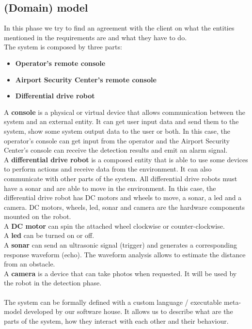 \documentclass{llncs}
\newcommand{\labelssec}[1]{\label{ssec:#1}}
\begin{document}
\subsection{(Domain) model}
\labelssec{Domain model}
In this phase we try to find an agreement with the client on what the entities mentioned in the requirements are and what they have to do.\\The system is composed by three parts:
\begin{itemize}
\item \textbf{Operator's remote console}
\item \textbf{Airport Security Center's remote console}
\item \textbf{Differential drive robot}
\end{itemize}
A \textbf{console} is a physical or virtual device that allows communication between the system and an external entity. It can get user input data and send them to the system, show some system output data to the user or both. In this case, the operator's console can get input from the operator and the Airport Security Center's console can receive the detection results and emit an alarm signal.
\\A \textbf{differential drive robot} is a composed entity that is able to use some devices to perform actions and receive data from the environment. It can also communicate with other parts of the system. All differential drive robots must have a sonar and are able to move in the environment. In this case, the differential drive robot has DC motors and wheels to move, a sonar, a led and a camera.
DC motors, wheels, led, sonar and camera are the hardware components mounted on the robot.
\\A \textbf{DC motor} can spin the attached wheel clockwise or counter-clockwise.
\\A \textbf{led} can be turned on or off.
\\A \textbf{sonar} can send an ultrasonic signal (trigger) and generates a corresponding response waveform (echo). The waveform analysis allows to estimate the distance from an obstacle.
\\ A \textbf{camera} is a device that can take photos when requested. It will be used by the robot in the detection phase.\\ \\
The system can be formally defined with a custom language / executable meta-model developed by our software house. It allows us to describe what are the parts of the system, how they interact with each other and their behaviour. \\ \\
\end{document}
